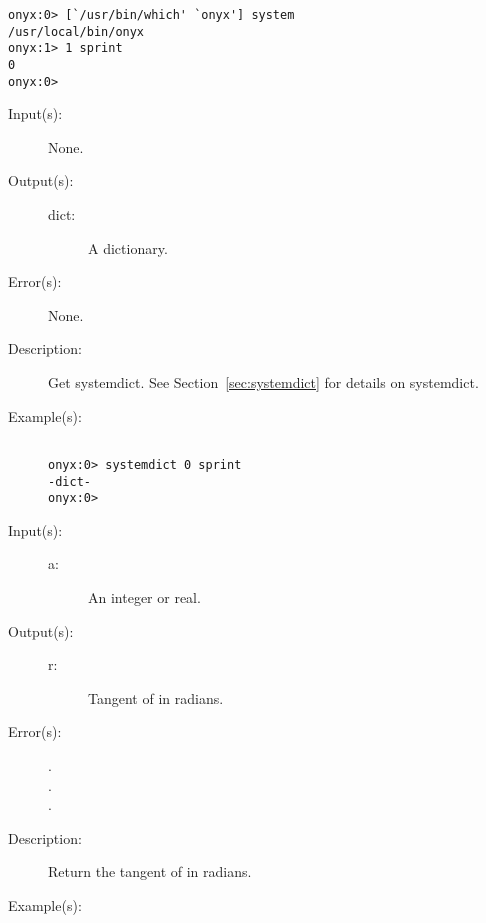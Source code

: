 \begin{description}
\begin{description}
\begin{verbatim}
onyx:0> [`/usr/bin/which' `onyx'] system
/usr/local/bin/onyx
onyx:1> 1 sprint
0
onyx:0>
		\end{verbatim}
	\end{description}
\label{systemdict:systemdict}
\item[{\onyxop{--}{systemdict}{dict}}: ]
	\begin{description}\item[]
	\item[Input(s): ] None.
	\item[Output(s): ]
		\begin{description}\item[]
		\item[dict: ]
			A dictionary.
		\end{description}
	\item[Error(s): ] None.
	\item[Description: ]
		Get systemdict.  See Section~\ref{sec:systemdict} for details on
		systemdict.
	\item[Example(s): ]\begin{verbatim}

onyx:0> systemdict 0 sprint
-dict-
onyx:0>
		\end{verbatim}
	\end{description}
\label{systemdict:tan}
\item[{\onyxop{a}{sinh}{r}}: ]
	\begin{description}\item[]
	\item[Input(s): ]
		\begin{description}\item[]
		\item[a: ]
			An integer or real.
		\end{description}
	\item[Output(s): ]
		\begin{description}\item[]
		\item[r: ]
			Tangent of  in radians.
		\end{description}
	\item[Error(s): ]
		\begin{description}\item[]
		\item[.]
		\item[.]
		\item[.]
		\end{description}
	\item[Description: ]
		Return the tangent of  in radians.
	\item[Example(s): ]\begin{verbatim}


\end{verbatim}
\end{description}
\end{description}
